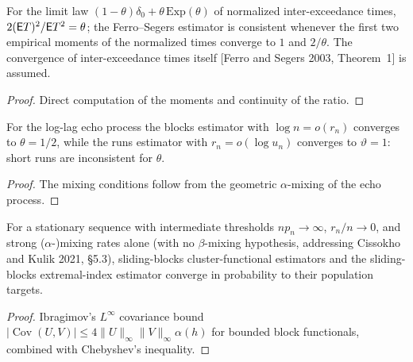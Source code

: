 \begin{theorem}
  \label{thm:intervals-estimator}
  \leanok
  For the limit law $(1-\theta)\delta_0 + \theta\,\mathrm{Exp}(\theta)$ of normalized inter-exceedance times, $2(\mathsf{E} T)^2/\mathsf{E} T^2 = \theta$;
  the Ferro--Segers estimator is consistent whenever the first two empirical moments of the normalized times converge
  to $1$ and $2/\theta$. The convergence of inter-exceedance times itself [Ferro and Segers 2003, Theorem~1] is assumed.
\end{theorem}
\begin{proof}
  \leanok
  Direct computation of the moments and continuity of the ratio.
\end{proof}

\begin{theorem}
  \label{thm:echo-estimators}
  \leanok
  For the log-lag echo process the blocks estimator with $\log n = o(r_n)$ converges to $\theta = 1/2$, while the runs
  estimator with $r_n = o(\log u_n)$ converges to $\vartheta = 1$: short runs are inconsistent for $\theta$.
\end{theorem}
\begin{proof}
  \leanok
  The mixing conditions follow from the geometric $\alpha$-mixing of the echo process.
\end{proof}

\begin{theorem}
  \label{thm:sliding-blocks-alpha-mixing}
  \leanok
  For a stationary sequence with intermediate thresholds $n p_n \to \infty$, $r_n/n \to 0$, and strong
  ($\alpha$-)mixing rates alone (with no $\beta$-mixing hypothesis, addressing Cissokho and Kulik 2021, \S5.3),
  sliding-blocks cluster-functional estimators and the sliding-blocks extremal-index estimator converge in
  probability to their population targets.
\end{theorem}
\begin{proof}
  \leanok
  Ibragimov's $L^\infty$ covariance bound $|\operatorname{Cov}(U, V)| \le 4 \|U\|_\infty \|V\|_\infty \alpha(h)$
  for bounded block functionals, combined with Chebyshev's inequality.
\end{proof}

